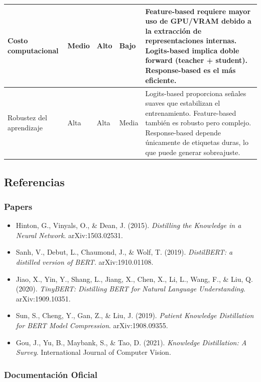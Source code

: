 \documentclass[12pt]{article}
\begin{document}
\begin{longtable}{|p{3.5cm}|p{2cm}|p{2cm}|p{2cm}|p{6cm}|}
		Costo computacional
		& Medio 
		& Alto 
		& Bajo 
		& Feature-based requiere mayor uso de GPU/VRAM debido a la extracción de representaciones internas. Logits-based implica doble forward (teacher + student). Response-based es el más eficiente. \\
		\hline
		
		Robustez del aprendizaje
		& Alta 
		& Alta 
		& Media 
		& Logits-based proporciona señales suaves que estabilizan el entrenamiento. Feature-based también es robusto pero complejo. Response-based depende únicamente de etiquetas duras, lo que puede generar sobreajuste. \\
		\hline
		
	\end{longtable}
	
	\subsection{Referencias}
	
	\subsubsection{Papers}
	
	\begin{itemize}
		\item Hinton, G., Vinyals, O., \& Dean, J. (2015). \textit{Distilling the Knowledge in a Neural Network}. arXiv:1503.02531.
		
		\item Sanh, V., Debut, L., Chaumond, J., \& Wolf, T. (2019). \textit{DistilBERT: a distilled version of BERT}. arXiv:1910.01108.
		
		\item Jiao, X., Yin, Y., Shang, L., Jiang, X., Chen, X., Li, L., Wang, F., \& Liu, Q. (2020). \textit{TinyBERT: Distilling BERT for Natural Language Understanding}. arXiv:1909.10351.
		
		\item Sun, S., Cheng, Y., Gan, Z., \& Liu, J. (2019). \textit{Patient Knowledge Distillation for BERT Model Compression}. arXiv:1908.09355.
		
		\item Gou, J., Yu, B., Maybank, S., \& Tao, D. (2021). \textit{Knowledge Distillation: A Survey}. International Journal of Computer Vision.
	\end{itemize}
	
	\subsubsection{Documentación Oficial}
	
\end{document}
